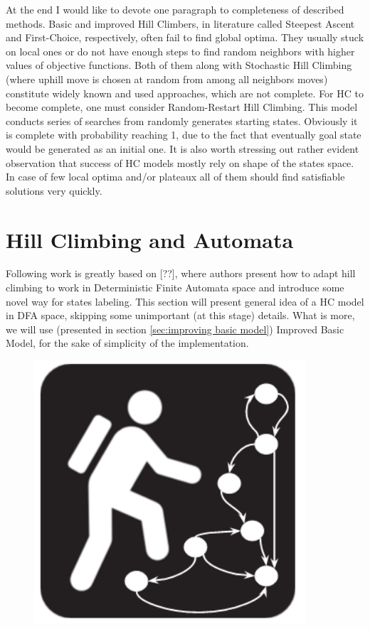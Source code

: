 \documentclass{mini}
\begin{document}
At the end I would like to devote one paragraph to completeness of described methods. Basic and improved Hill Climbers, in literature called Steepest Ascent and First-Choice, respectively, often fail to find global optima. They usually stuck on local ones or do not have enough steps to find random neighbors with higher values of objective functions. Both of them along with Stochastic Hill Climbing (where uphill move is chosen at random from among all neighbors moves) constitute widely known and used approaches, which are not complete. For HC to become complete, one must consider Random-Restart Hill Climbing. This model conducts series of searches from randomly generates starting states. Obviously it is complete with probability reaching 1, due to the fact that eventually goal state would be generated as an initial one. It is also worth stressing out rather evident observation that success of HC models mostly rely on shape of the states space. In case of few local optima and/or plateaux all of them should find satisfiable solutions very quickly. 


\section{Hill Climbing and Automata}

Following work is greatly based on [??], where authors present how to adapt hill climbing to work in Deterministic Finite Automata space and introduce some novel way for states labeling. This section will present general idea of a HC model in DFA space, skipping some unimportant (at this stage) details. What is more, we will use (presented in section \ref{sec:improving basic model}) Improved Basic Model, for the sake of simplicity of the implementation.

\begin{figure}
  \begin{center}
    \includegraphics[width=0.9\textwidth]{./images/hc_auto_1.png}
  \end{center}
\end{figure}
\end{document}
